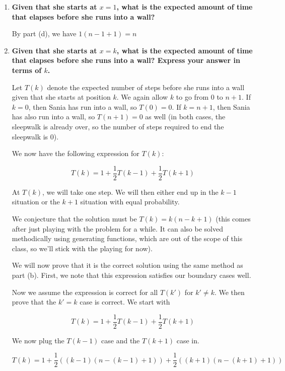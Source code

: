 \documentclass{article}
\begin{document}
\begin{enumerate}[label=(\alph*)]
    \vspace{2cm}
    
    \item \textbf{Given that she starts at $x = 1$, what is the expected amount of time that elapses before she runs into a wall?}
    
    By part (d), we have $\boxed{1(n - 1 + 1) = n}$

    \vspace{2cm}
    
    \item \textbf{Given that she starts at $x = k$, what is the expected amount of time that elapses before she runs into a wall? Express your answer in terms of $k$.}
    
    Let $T(k)$ denote the expected number of steps before she runs into a wall given that she starts at position $k$. We again allow $k$ to go from $0$ to $n + 1$. If $k = 0$, then Sania has run into a wall, so $T(0) = 0$. If $k = n + 1$, then Sania has also run into a wall, so $T(n + 1) = 0$ as well (in both cases, the sleepwalk is already over, so the number of steps required to end the sleepwalk is $0$).

    We now have the following expression for $T(k)$:

    $$T(k) = 1 + \frac{1}{2}T(k - 1) + \frac{1}{2}T(k + 1)$$
    
    At $T(k)$, we will take one step. We will then either end up in the $k - 1$ situation or the $k + 1$ situation with equal probability.

    We conjecture that the solution must be $T(k) = k(n - k + 1)$ (this comes after just playing with the problem for a while. It can also be solved methodically using generating functions, which are out of the scope of this class, so we'll stick with the playing for now).

    We will now prove that it is the correct solution using the same method as part (b). First, we note that this expression satisfies our boundary cases well.
    
    Now we assume the expression is correct for all $T(k')$ for $k' \neq k$. We then prove that the $k' = k$ case is correct. We start with

    $$T(k) = 1 + \frac{1}{2}T(k - 1) + \frac{1}{2}T(k + 1)$$

    We now plug the $T(k - 1)$ case and the $T(k + 1)$ case in.

    $$T(k) = 1 + \frac{1}{2}((k - 1)(n - (k - 1) + 1)) + \frac{1}{2}((k + 1)(n - (k + 1) + 1))$$


\end{enumerate}
\end{document}
